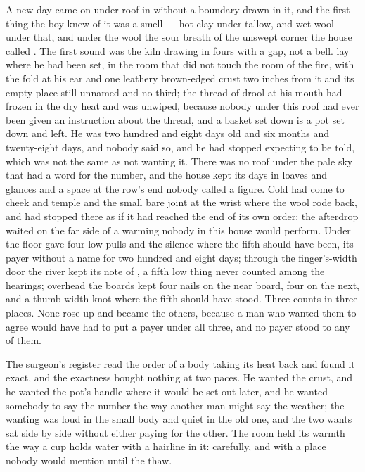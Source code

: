 
A new day came on under  roof in  without a boundary drawn in it, and the first thing the boy knew of it was a smell --- hot clay under tallow, and wet wool under that, and under the wool the sour breath of the unswept corner the house called . The first sound was the kiln drawing in fours with a gap, not a bell.  lay where he had been set, in the room that did not touch the room of the fire, with the fold at his ear and one leathery brown-edged crust two inches from it and its empty place still unnamed and no third; the thread of drool at his mouth had frozen in the dry heat and was unwiped, because nobody under this roof had ever been given an instruction about the thread, and a basket set down is a pot set down and left. He was two hundred and eight days old and six months and twenty-eight days, and nobody said so, and he had stopped expecting to be told, which was not the same as not wanting it. There was no roof under the pale sky that had a word for the number, and the house kept its days in loaves and glances and a space at the row's end nobody called a figure. Cold had come to cheek and temple and the small bare joint at the wrist where the wool rode back, and had stopped there as if it had reached the end of its own order; the afterdrop waited on the far side of a warming nobody in this house would perform. Under the floor  gave four low pulls and the silence where the fifth should have been, its payer without a name for two hundred and eight days; through the finger's-width door the river kept its note of , a fifth low thing never counted among the hearings; overhead the boards kept four nails on the near board, four on the next, and a thumb-width knot where the fifth should have stood. Three counts in three places. None rose up and became the others, because a man who wanted them to agree would have had to put a payer under all three, and no payer stood to any of them.

The surgeon's register read the order of a body taking its heat back and found it exact, and the exactness bought nothing at two paces. He wanted the crust, and he wanted the pot's handle where it would be set out later, and he wanted somebody to say the number the way another man might say the weather; the wanting was loud in the small body and quiet in the old one, and the two wants sat side by side without either paying for the other. The room held its warmth the way a cup holds water with a hairline in it: carefully, and with a place nobody would mention until the thaw.

